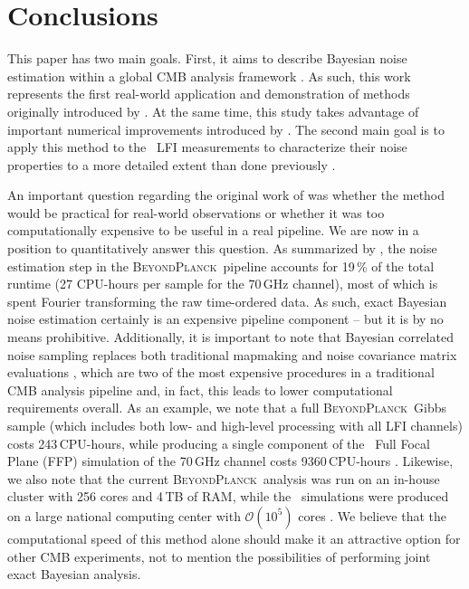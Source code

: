 \documentclass{aa}
\newcommand{\BP}{\textsc{BeyondPlanck}}
\begin{document}
\section{Conclusions}
\label{sec:conclusions}

This paper has two main goals. First, it aims to describe Bayesian
noise estimation within a global CMB analysis framework
\citep{bp01}. As such, this work represents the first real-world
application and demonstration of methods originally introduced by
\citet{wehus:2012}. At the same time, this study takes advantage of
important numerical improvements introduced by \citet{bp02}. The
second main goal is to apply this method to the \Planck\ LFI
measurements to characterize their noise properties to a more detailed extent than done previously \citep{planck2016-l02}.

An important question regarding the original work of
\citet{wehus:2012} was whether the method would be practical for
real-world observations or whether it was too computationally
expensive to be useful in a real pipeline. We are now in a position to
quantitatively answer this question. As summarized by \citep{bp01,bp03},
the noise estimation step in the \BP\ pipeline accounts for 19\,\% of
the total runtime (27 CPU-hours per sample for the 70\,GHz channel),
most of which is spent Fourier transforming the raw time-ordered
data. As such, exact Bayesian noise estimation certainly is an
expensive pipeline component -- but it is by no means
prohibitive. Additionally, it is important to note that Bayesian
correlated noise sampling replaces both traditional mapmaking and
noise covariance matrix evaluations \citep{bp02,bp10}, which are two
of the most expensive procedures in a traditional CMB analysis
pipeline \citep{planck2016-l01} and, in fact, this leads to lower
computational requirements overall. As an example, we note that a full
\BP\ Gibbs sample (which includes both low- and high-level processing
with all LFI channels) costs 243\,CPU-hours, while producing a single
component of the \Planck\ Full Focal Plane (FFP) simulation of
the 70\,GHz channel costs 9360\,CPU-hours \citep{planck2014-a14}. Likewise, we also note that
the current \BP\ analysis was run on an in-house cluster with 256
cores and 4\,TB of RAM, while the \Planck\ simulations were produced
on a large national computing center with $\mathcal{O}(10^5)$ cores
\citep{planck2016-l01,planck2020-LVII}. We believe that the computational speed
of this method alone should make it an attractive option for other CMB
experiments, not to mention the possibilities of performing joint
exact Bayesian analysis. 
\end{document}
